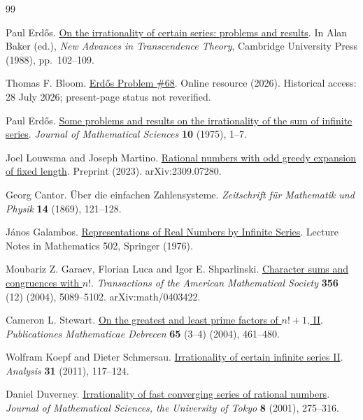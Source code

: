 \documentclass[11pt]{article}
\begin{document}
\begin{thebibliography}{99}

Paul Erd{\H o}s. \href{https://doi.org/10.1017/CBO9780511897184.009}{On the irrationality of certain series: problems and results}.
In Alan Baker (ed.), \emph{New Advances in Transcendence Theory}, Cambridge University Press (1988), pp.~102--109.

Thomas F. Bloom. \href{https://www.erdosproblems.com/68}{Erd{\H o}s Problem {\#68}}.
Online resource (2026). Historical access: 28 July 2026; present-page status not reverified.

Paul Erd{\H o}s. \href{https://www.renyi.hu/~p_erdos/1976-44.pdf}{Some problems and results on the irrationality of the sum of infinite series}.
\emph{Journal of Mathematical Sciences} \textbf{10} (1975), 1--7.

Joel Louwsma and Joseph Martino. \href{https://arxiv.org/abs/2309.07280v1}{Rational numbers with odd greedy expansion of fixed length}.
Preprint (2023). arXiv:2309.07280.

Georg Cantor. {\"U}ber die einfachen Zahlensysteme.
\emph{Zeitschrift f{\"u}r Mathematik und Physik} \textbf{14} (1869), 121--128.

J{\'a}nos Galambos. \href{https://doi.org/10.1007/BFb0081642}{Representations of Real Numbers by Infinite Series}.
Lecture Notes in Mathematics 502, Springer (1976).

Moubariz Z. Garaev, Florian Luca and Igor E. Shparlinski. \href{https://doi.org/10.1090/S0002-9947-04-03612-8}{Character sums and congruences with {$n!$}}.
\emph{Transactions of the American Mathematical Society} \textbf{356} (12) (2004), 5089--5102. arXiv:math/0403422.

Cameron L. Stewart. \href{https://doi.org/10.5486/PMD.2004.3190}{On the greatest and least prime factors of {$n!+1$}, {II}}.
\emph{Publicationes Mathematicae Debrecen} \textbf{65} (3--4) (2004), 461--480.

Wolfram Koepf and Dieter Schmersau. \href{https://doi.org/10.1524/anly.2011.1094}{Irrationality of certain infinite series {II}}.
\emph{Analysis} \textbf{31} (2011), 117--124.

Daniel Duverney. \href{https://www.ms.u-tokyo.ac.jp/journal/pdf/jms080206.pdf}{Irrationality of fast converging series of rational numbers}.
\emph{Journal of Mathematical Sciences, the University of Tokyo} \textbf{8} (2001), 275--316.


\end{thebibliography}
\end{document}
